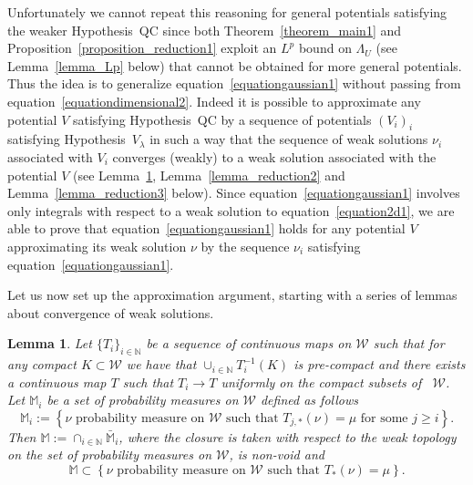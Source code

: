 \documentclass[a4paper,10pt]{article}
\newcommand{\assign}{:=}
\newcommand{\asterisk}{\mathord{*}}
\newtheorem{lemma}{Lemma}
\begin{document}
Unfortunately we cannot repeat this reasoning for general potentials
satisfying the weaker Hypothesis~QC since both Theorem~\ref{theorem_main1} and
Proposition~\ref{proposition_reduction1} exploit an $L^p$ bound on $\Lambda_U$
(see Lemma~\ref{lemma_Lp} below) that cannot be obtained for more general
potentials. Thus the idea is to generalize
equation~{\eqref{equationgaussian1}} without passing from
equation~{\eqref{equationdimensional2}}. Indeed it is possible to approximate
any potential $V$ satisfying Hypothesis~QC by a sequence of potentials
$(V_i)_i$ satisfying Hypothesis~$V_{\lambda}$ in such a way that the sequence
of weak solutions $\nu_i$ associated with $V_i$ converges (weakly) to a weak
solution associated with the potential $V$ (see Lemma~\ref{lemma_reduction1},
Lemma~\ref{lemma_reduction2} and Lemma~\ref{lemma_reduction3} below). Since
equation~{\eqref{equationgaussian1}} involves only integrals with respect to a
weak solution to equation~{\eqref{equation2d1}}, we are able to prove that
equation~{\eqref{equationgaussian1}} holds for any potential $V$ approximating
its weak solution $\nu$ by the sequence $\nu_i$ satisfying
equation~{\eqref{equationgaussian1}}. \

Let us now set up the approximation argument, starting with a series of
lemmas about convergence of weak solutions.

\begin{lemma}
  \label{lemma_reduction1}Let $\{ T_i \}_{i \in \mathbb{N}}$ be a sequence of
  continuous maps on $\mathcal{W}$ such that for any compact $K \subset
  \mathcal{W}$ we have that $\cup_{i \in \mathbb{N}} T_i^{- 1} (K)$ is
  pre-compact and there exists a continuous map $T$ such that $T_i \rightarrow
  T$ uniformly on the compact subsets of \ $\mathcal{W}$. Let $\mathbb{M}_i$
  be a set of probability measures on $\mathcal{W}$ defined as follows
  \[ \mathbb{M}_i \assign \left\{ \text{$\nu$ probability measure on
     $\mathcal{W}$ such that $T_{j, \asterisk} (\nu) = \mu$ for some $j
     \geqslant i$} \right\} . \]
  Then $\mathbb{M} \assign \cap_{i \in \mathbb{N}} \bar{\mathbb{M}}_i$, where
  the closure is taken with respect to the weak topology on the set of
  probability measures on $\mathcal{W}$, is non-void and
  \[ \mathbb{M} \subset \left\{ \text{$\nu$ probability measure on
     $\mathcal{W}$ such that $T_{\asterisk} (\nu) = \mu$} \right\} . \]
\end{lemma}
\end{document}
